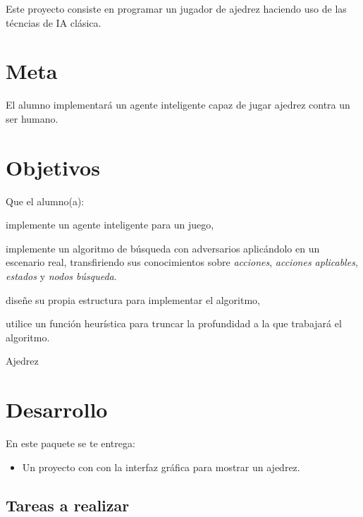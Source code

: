 
Este proyecto consiste en programar un jugador de ajedrez haciendo uso de las técncias de IA clásica.

\section{Meta}

El alumno implementará un agente inteligente capaz de jugar ajedrez contra un ser humano.

\section{Objetivos}

Que el alumno(a):
\begin{compactitem}
 \item implemente un agente inteligente para un juego,
 \item implemente un algoritmo de búsqueda con adversarios aplicándolo en un escenario real, transfiriendo sus conocimientos sobre \emph{acciones}, \emph{acciones aplicables}, \emph{estados} y \emph{nodos búsqueda}.
 \item diseñe su propia estructura para implementar el algoritmo,
 \item utilice un función heurística para truncar la profundidad a la que trabajará el algoritmo.
\end{compactitem}


\begin{auxcode}
 \caption{Ajedrez}
 \centering
\end{auxcode}

\section{Desarrollo}

En este paquete se te entrega:
\begin{itemize}
 \item Un proyecto con  con la interfaz gráfica para mostrar un ajedrez.
\end{itemize}


\subsection{Tareas a realizar}

